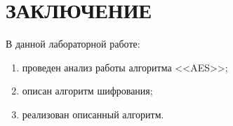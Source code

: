 \chapter*{ЗАКЛЮЧЕНИЕ}

В данной лабораторной работе:

\begin{enumerate}[label=---]
    \item проведен анализ работы алгоритма <<AES>>;
    \item описан алгоритм шифрования;
    \item реализован описанный алгоритм.
\end{enumerate}
